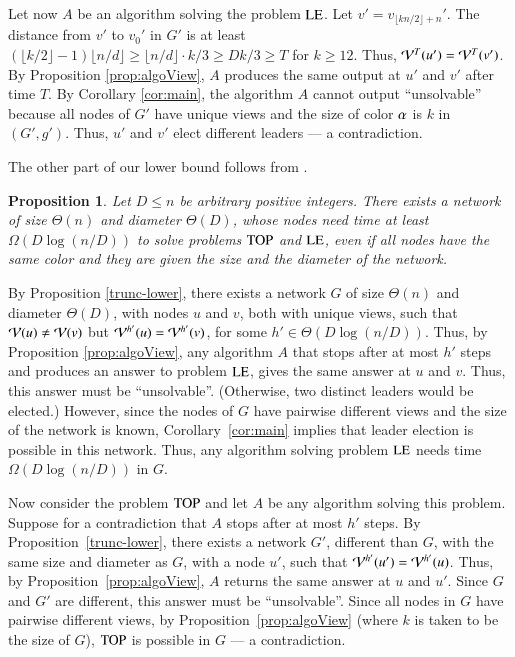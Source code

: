 \documentclass[a4paper,10pt]{article}
\newtheorem{proposition}{Proposition}[section]
\newcommand{\view}[1][]{\if!#1!\mathcal{V}\else\mathcal{V}^{#1}\fi}
\newcommand{\problemLE}{\textup{LE}}
\newcommand{\problemTOP}{\textup{TOP}}
\newcommand{\cV}{{\cal V}}
\newenvironment{proof}[1][Proof]
{\par\noindent{\bf #1:} }{\hspace*{\fill}\nolinebreak{$\Box$}\bigskip\par}
\begin{document}
\begin{proof}
Let now $A$ be an algorithm solving the problem $\problemLE$.
Let $v'=v_{\lfloor kn/2\rfloor+n}'$.
The distance from $v'$ to $v_0'$ in $G'$ is at least $(\lfloor k/2\rfloor-1)\lfloor n/d\rfloor\geq \lfloor n/d\rfloor\cdot k/3\geq Dk/3\geq T$ for $k\geq 12$.
Thus, $\view[T](u')=\view[T](v')$.
By Proposition \ref{prop:algoView}, $A$ produces the same output at $u'$ and $v'$ after time $T$.
By Corollary \ref{cor:main}, the algorithm $A$ cannot output ``unsolvable'' because all nodes of $G'$ have unique views and the size of color $\alpha$ is $k$ in $(G',g')$.
Thus, $u'$ and $v'$ elect different leaders --- a contradiction.
\end{proof}

The other part of our lower bound follows from \cite{DKP}.
\begin{proposition}\label{second-lb}
Let $D \leq n$ be arbitrary positive integers. There exists a network of size $\Theta(n)$
 and diameter $\Theta(D)$, whose nodes need time at least $\Omega(D\log(n/D))$ to solve problems $\problemTOP$ and $\problemLE$, even if all nodes have the same color and they are given the size and the diameter of the 
 network.
\end{proposition}
\begin{proof}
By Proposition \ref{trunc-lower}, there exists a network $G$ of size $\Theta(n)$ and diameter $\Theta(D)$, with nodes $u$ and $v$, both with unique views,
such that $\cV(u)\neq \cV(v)$ but $\cV^{h'}(u)=\cV^{h'}(v)$, for some $h' \in \Theta(D \log (n/D))$.
Thus, by Proposition \ref{prop:algoView}, any algorithm $A$ that stops after at most $h'$ steps and produces an answer to problem $\problemLE$, gives the same answer at $u$ and $v$.
Thus, this answer must be ``unsolvable''.
(Otherwise, two distinct leaders would be elected.)
However, since the nodes of $G$ have pairwise different views and the size of the network is known, Corollary~\ref{cor:main} implies that leader election is possible in this network.
Thus, any algorithm solving problem $\problemLE$ needs time $\Omega(D\log(n/D))$ in $G$.


Now consider the problem $\problemTOP$ and let $A$ be any algorithm solving this problem.
Suppose for a contradiction that $A$ stops after at most $h'$ steps. 
By Proposition~\ref{trunc-lower}, there exists a network $G'$, different than $G$, with the same size and diameter as $G$, with a node $u'$, such that $\view[h'](u')=\view[h'](u)$.
Thus, by Proposition~\ref{prop:algoView}, $A$ returns the same answer at $u$ and $u'$.
Since $G$ and $G'$ are different, this answer must be ``unsolvable''.
Since all nodes in $G$ have pairwise different views, by Proposition~\ref{prop:algoView} (where $k$ is {taken} to be the size of $G$), $\problemTOP$ is possible in $G$ --- a contradiction.
\end{proof}
\end{document}
